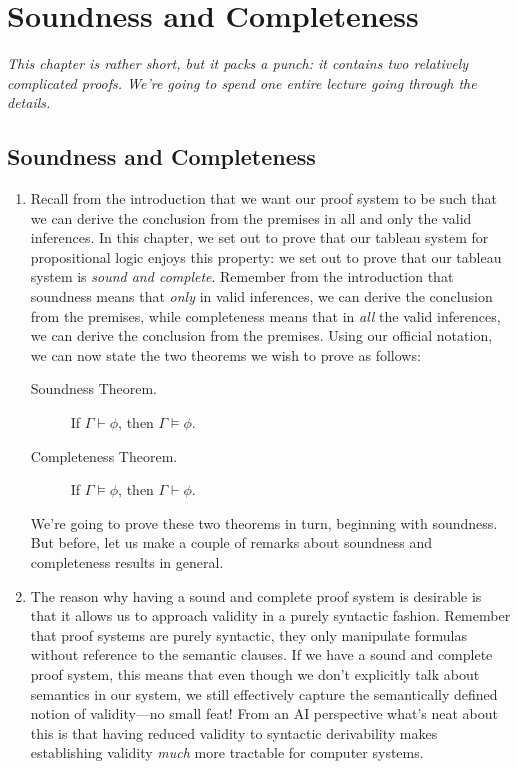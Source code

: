 \chapter{Soundness and Completeness}

\emph{This chapter is rather short, but it packs a punch: it contains two  relatively complicated proofs. We're going to spend one entire lecture going through the details.}

\section{Soundness and Completeness}

\begin{enumerate}[\thesection.1]

		\item Recall from the introduction that we want our proof system to be such that we can derive the conclusion from the premises in all and only the valid inferences. In this chapter, we set out to prove that our tableau system for propositional logic enjoys this property: we set out to prove that our tableau system is \emph{sound and complete}. Remember from the introduction that soundness means that \emph{only} in valid inferences, we can derive the conclusion from the premises, while completeness means that in \emph{all} the valid inferences, we can derive the conclusion from the premises. Using our official notation, we can now state the two theorems we wish to prove as follows:
		\begin{description}
		
			\item[Soundness Theorem.] If $\Gamma\vdash\phi$, then $\Gamma\vDash\phi$.
			
			\item[Completeness Theorem.] If $\Gamma\vDash\phi$, then $\Gamma\vdash\phi$.
		
		\end{description}
We're going to prove these two theorems in turn, beginning with soundness. But before, let us make a couple of remarks about soundness and completeness results in general.

	\item The reason why having a sound and complete proof system is desirable is that it allows us to approach validity in a purely syntactic fashion. Remember that proof systems are purely syntactic, they only manipulate formulas without reference to the semantic clauses. If we have a sound and complete proof system, this means that even though we don't explicitly talk about semantics in our system, we still effectively capture the semantically defined notion of validity---no small feat! From an AI perspective what's neat about this is that having reduced validity to syntactic derivability makes establishing validity \emph{much} more tractable for computer systems.
	

\end{enumerate}
